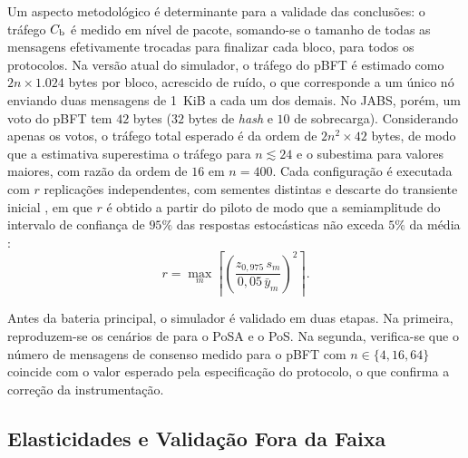 Um aspecto metodológico é determinante para a validade das conclusões: o tráfego $C_{\mathrm{b}}$ é medido em nível de pacote, somando-se o tamanho de todas as mensagens efetivamente trocadas para finalizar cada bloco, para todos os protocolos. Na versão atual do simulador, o tráfego do pBFT é estimado como $2n \times 1.024$ bytes por bloco, acrescido de ruído, o que corresponde a um único nó enviando duas mensagens de 1~KiB a cada um dos demais. No JABS, porém, um voto do pBFT tem $42$ bytes ($32$ bytes de \textit{hash} e $10$ de sobrecarga). Considerando apenas os votos, o tráfego total esperado é da ordem de $2n^{2} \times 42$ bytes, de modo que a estimativa superestima o tráfego para $n \lesssim 24$ e o subestima para valores maiores, com razão da ordem de $16$ em $n = 400$.  Cada configuração é executada com $r$ replicações independentes, com sementes distintas e descarte do transiente inicial \citep{Law2015}, em que $r$ é obtido a partir do piloto de modo que a semiamplitude do intervalo de confiança de $95\%$ das respostas estocásticas não exceda $5\%$ da média \citep{Jain1991}:
\begin{equation}
r = \max_{m}\left\lceil \left( \frac{z_{0,975}\, s_{m}}{0{,}05\, \bar{y}_{m}} \right)^{2} \right\rceil.
\label{eq:reps}
\end{equation}

Antes da bateria principal, o simulador é validado em duas etapas. Na primeira, reproduzem-se os cenários de \citep{Caburlao2026clei} para o PoSA e o PoS. Na segunda, verifica-se que o número de mensagens de consenso medido para o pBFT com $n \in \{4, 16, 64\}$ coincide com o valor esperado pela especificação do protocolo, o que confirma a correção da instrumentação.

\subsection{Elasticidades e Validação Fora da Faixa}

